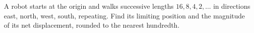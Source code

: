 A robot starts at the origin and walks successive lengths $16,8,4,2,\ldots$ in directions east, north, west, south, repeating. Find its limiting position and the magnitude of its net displacement, rounded to the nearest hundredth.
